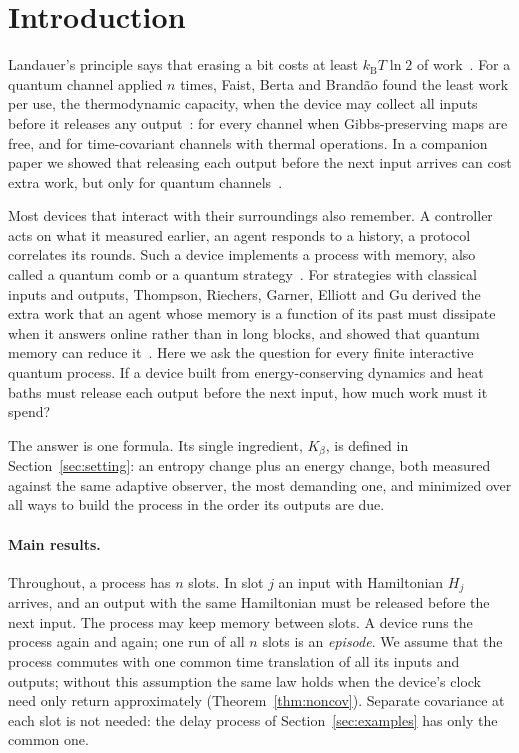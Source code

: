 \documentclass[11pt]{article}
\theoremstyle{definition}
\theoremstyle{remark}
\newcommand{\kB}{k_{\mathrm B}}
\newcommand{\Kb}{K_\beta}
\begin{document}
\section{Introduction}\label{sec:intro}

Landauer's principle says that erasing a bit costs at least $\kB T\ln2$ of work~\cite{Landauer61}. For a quantum channel applied $n$ times, Faist, Berta and Brand\~ao found the least work per use, the thermodynamic capacity, when the device may collect all inputs before it releases any output~\cite{FBB19,FBB21}: for every channel when Gibbs-preserving maps are free, and for time-covariant channels with thermal operations. In a companion paper we showed that releasing each output before the next input arrives can cost extra work, but only for quantum channels~\cite{SaveWork}.

Most devices that interact with their surroundings also remember. A controller acts on what it measured earlier, an agent responds to a history, a protocol correlates its rounds. Such a device implements a process with memory, also called a quantum comb or a quantum strategy~\cite{Chiribella08,GutoskiWatrous07}. For strategies with classical inputs and outputs, Thompson, Riechers, Garner, Elliott and Gu derived the extra work that an agent whose memory is a function of its past must dissipate when it answers online rather than in long blocks, and showed that quantum memory can reduce it~\cite{Thompson25}. Here we ask the question for every finite interactive quantum process. If a device built from energy-conserving dynamics and heat baths must release each output before the next input, how much work must it spend?

The answer is one formula. Its single ingredient, $\Kb$, is defined in Section~\ref{sec:setting}: an entropy change plus an energy change, both measured against the same adaptive observer, the most demanding one, and minimized over all ways to build the process in the order its outputs are due.

\paragraph{Main results.} Throughout, a process has $n$ slots. In slot $j$ an input with Hamiltonian $H_j$ arrives, and an output with the same Hamiltonian must be released before the next input. The process may keep memory between slots. A device runs the process again and again; one run of all $n$ slots is an \emph{episode}. We assume that the process commutes with one common time translation of all its inputs and outputs; without this assumption the same law holds when the device's clock need only return approximately (Theorem~\ref{thm:noncov}). Separate covariance at each slot is not needed: the delay process of Section~\ref{sec:examples} has only the common one.
\end{document}
